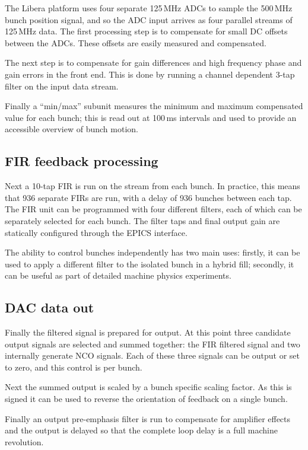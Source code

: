 \documentclass{jacow}
\begin{document}
The Libera platform uses four separate 125\,MHz ADCs to sample the 500\,MHz
bunch position signal, and so the ADC input arrives as four parallel streams of
125\,MHz data.  The first processing step is to compensate for small DC offsets
between the ADCs.  These offsets are easily measured and compensated.

The next step is to compensate for gain differences and high frequency phase and
gain errors in the front end.  This is done by running a channel dependent 3-tap
filter on the input data stream.

Finally a ``min/max'' subunit measures the minimum and maximum compensated value
for each bunch; this is read out at 100\,ms intervals and used to provide an
accessible overview of bunch motion.


\subsection{FIR feedback processing}

Next a 10-tap FIR is run on the stream from each bunch.  In practice, this means
that 936 separate FIRs are run, with a delay of 936 bunches between each tap.
The FIR unit can be programmed with four different filters, each of which can be
separately selected for each bunch.  The filter taps and final output gain are
statically configured through the EPICS interface.

The ability to control bunches independently has two main uses: firstly, it can
be used to apply a different filter to the isolated bunch in a hybrid fill;
secondly, it can be useful as part of detailed machine physics experiments.


\subsection{DAC data out}

Finally the filtered signal is prepared for output.  At this point three
candidate output signals are selected and summed together: the FIR filtered
signal and two internally generate NCO signals.  Each of these three signals can
be output or set to zero, and this control is per bunch.

Next the summed output is scaled by a bunch specific scaling factor.  As this is
signed it can be used to reverse the orientation of feedback on a single bunch.

Finally an output pre-emphasis filter is run to compensate for amplifier effects
and the output is delayed so that the complete loop delay is a full machine
revolution.
\end{document}
